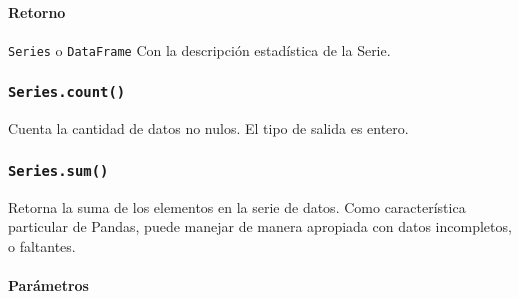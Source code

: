     \paragraph{Retorno}
    \texttt{Series} o \texttt{DataFrame}
    Con la descripción estadística de la Serie.


    \subsubsection{\texttt{Series.count()}} Cuenta la cantidad de datos no nulos. El tipo de salida es entero.

    \subsubsection{\texttt{Series.sum()}} Retorna la suma de los elementos en la serie de datos. Como característica particular de Pandas, puede manejar de manera apropiada con datos incompletos, o faltantes.

    \paragraph{Parámetros}

